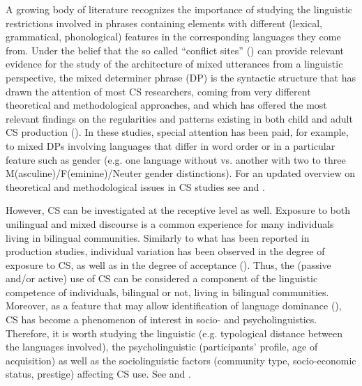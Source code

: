 \documentclass[output=paper]{langscibook}
\begin{document}
{A growing body of literature recognizes the importance of studying the linguistic restrictions involved in phrases containing elements with different (lexical, grammatical, phonological) features in the corresponding languages they come from. Under the belief that the so called “conflict sites”} {(\citealt{PoplackMeechan1998})} {can provide relevant evidence for the study of the architecture of mixed utterances from a linguistic perspective, the mixed determiner phrase (DP) is the syntactic structure that has drawn the attention of most CS researchers, coming from very different theoretical and methodological approaches, and which has offered the most relevant findings on the regularities and patterns existing in both child and} {adult CS production} {(\citealt{Beatty-MartínezDussias2019,CantoneMüller2008,Chan2008,JorschickEtAl2011,LicerasEtAl2008})}. In these studies, special attention has been paid, for example, to mixed DPs involving languages that differ in word order or in a particular feature such as gender (e.g. one language without vs. another with two to three M(asculine)/F(eminine)/Neuter gender distinctions). For an updated overview on theoretical and methodological issues in CS studies see \citet{Munarriz-IbarrolaEtAl2018} {and \citet{ParafitaCoutoEtAlinpress}}.

{However, CS can be investigated at the receptive level as well. Exposure to both unilingual and mixed discourse is a common experience for many individuals living in bilingual communities. Similarly to what has been reported in production studies, individual variation has been observed in the degree of exposure to CS, as well as in the degree of acceptance} {(\citealt{Lipski2016,ParafitaCoutoEtAl2015welsh})}{. Thus, the (passive and/or active) use of CS can be considered a component of the linguistic competence of individuals, bilingual or not, living in bilingual communities. Moreover, as a feature that may allow identification of language dominance} {(\citealt{HerediaAltarriba2001})}, CS has become a phenomenon of interest in socio- and psycholinguistics. Therefore, it is worth studying the linguistic (e.g. typological distance between the languages involved), the psycholinguistic (participants’ profile, age of acquisition) as well as the sociolinguistic factors (community type, socio-economic status, prestige) affecting CS use. See \citet{Beatty-MartínezDussias2019,BlokzijlEtAl2017} and \citet{ParafitaCoutoGullberg2019}.
\end{document}
